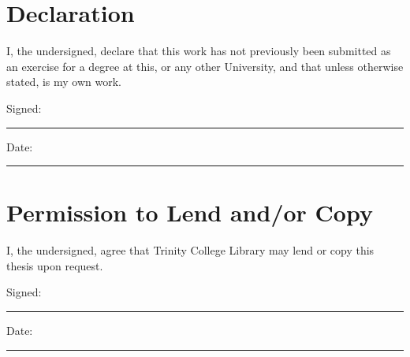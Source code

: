 \chapter{Declaration}
\begin{spacing}{2}
\vspace{1cm}
I, the undersigned, declare that this work has not previously been submitted as an exercise for a degree at this, or any other University, and that unless otherwise stated, is my own work.

\vspace{3cm}
Signed:~\rule{5cm}{0.3pt}\hfill Date:~\rule{5cm}{0.3pt}
\end{spacing}
\newpage
\thispagestyle{empty}
\chapter*{Permission to Lend and/or Copy}
\begin{spacing}{2}
\vspace{1cm}
I, the undersigned, agree that Trinity College Library may lend or copy this thesis upon
request.

\vspace{3cm}
Signed:~\rule{5cm}{0.3pt}\hfill Date:~\rule{5cm}{0.3pt}
\end{spacing}
\newpage